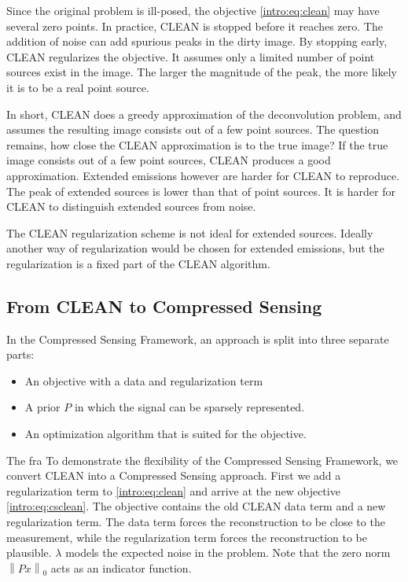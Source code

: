 Since the original problem is ill-posed, the objective \eqref{intro:eq:clean} may have several zero points. In practice, CLEAN is stopped before it reaches zero. The addition of noise can add spurious peaks in the dirty image. By stopping early, CLEAN regularizes the objective. It assumes only a limited number of point sources exist in the image. The larger the magnitude of the peak, the more likely it is to be a real point source.

In short, CLEAN does a greedy approximation of the deconvolution problem, and assumes the resulting image consists out of a few point sources. The question remains, how close the CLEAN approximation is to the true image? If the true image consists out of a few point sources, CLEAN produces a good approximation. Extended emissions however are harder for CLEAN to reproduce. The peak of extended sources is lower than that of point sources. It is harder for CLEAN to distinguish extended sources from noise.

The CLEAN regularization scheme is not ideal for extended sources. Ideally another way of regularization would be chosen for extended emissions, but the regularization is a fixed part of the CLEAN algorithm.


\subsection{From CLEAN to Compressed Sensing}
In the Compressed Sensing Framework, an approach is split into three separate parts:
\begin{itemize}
	\item An objective with a data and regularization term
	\item A prior $P$ in which the signal can be sparsely represented.
	\item An optimization algorithm that is suited for the objective.
\end{itemize}


The fra
To demonstrate the flexibility of the Compressed Sensing Framework, we convert CLEAN into a Compressed Sensing approach. First we add a regularization term to \eqref{intro:eq:clean} and arrive at the new objective \eqref{intro:eq:csclean}. The objective contains the old CLEAN data term and a new regularization term. The data term forces the reconstruction to be close to the measurement, while the regularization term forces the reconstruction to be plausible. $\lambda$ models the expected noise in the problem. Note that the zero norm $\left \| Px \right \|_0$ acts as an indicator function. 


